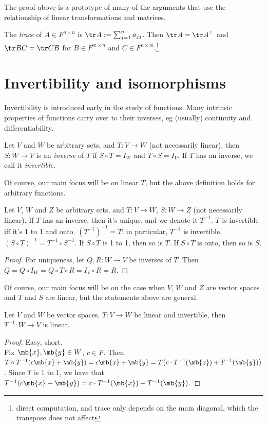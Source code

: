 The proof above is a prototype of many of the arguments that use the relationship of linear transformations and matrices.
\begin{exer}\label{e:tr-commute}
The \emph{trace} of $A \in F^{n \times n}$ is $\tr A:= \sum_{j=1}^na_{jj}$. Then $\tr A= \tr A^\top$ and $\tr BC= \tr CB$ for $B \in F^{m \times n}$ and $C \in F^{n \times m}$.\footnote{direct computation, and trace only depends on the main diagonal, which the transpose does not affect}
\end{exer}

\section{Invertibility and isomorphisms}
Invertibility is introduced early in the study of functions. Many intrinsic properties of functions carry over to their inverses, eg (usually) continuity and differentiability.
\begin{defn}
Let $V$ and $W$ be arbitrary sets, and $T:V \to W$ (not necessarily linear), then $S:W \to V$ is an \emph{inverse} of $T$ if $S \circ T=I_W$ and $T \circ S=I_V$. If $T$ has an inverse, we call it \emph{invertible}.
\end{defn}
Of course, our main focus will be on linear $T$, but the above definition holds for arbitrary functions.
\begin{lem}\label{l:comp-fn}
Let $V$, $W$ and $Z$ be arbitrary sets, and $T:V \to W$, $S:W \to Z$ (not necessarily linear). If $T$ has an inverse, then it's unique, and we denote it $T^{-1}$. $T$ is invertible iff it's 1 to 1 and onto. $(T^{-1})^{-1}=T$: in particular, $T^{-1}$ is invertible. $(S \circ T)^{-1}=T^{-1}\circ S^{-1}$. If $S \circ T$ is 1 to 1, then so is $T$. If $S \circ T$ is onto, then so is $S$.
\end{lem}
\begin{proof}
For uniqueness, let $Q,R:W \to V$ be inverses of $T$. Then $Q=Q \circ I_W=Q \circ T \circ R=I_V \circ R=R$.
\end{proof}
Of course, our main focus will be on the case when $V$, $W$ and $Z$ are vector spaces and $T$ and $S$ are linear, but the statements above are general.
\begin{lem}\label{l:inv-linear}
Let $V$ and $W$ be vector spaces, $T:V \to W$ be linear and invertible, then $T^{-1}:W \to V$ is linear.
\end{lem}
\begin{proof}
Easy, short.\\
Fix $\mb{x}, \mb{y}\in W$, $c \in F$. Then $T \circ T^{-1}(c \mb{x}+ \mb{y})=c \mb{x}+ \mb{y}=T \big( c \cdot T^{-1}( \mb{x})+T^{-1}( \mb{y}) \big)$. Since $T$ is 1 to 1, we have that $T^{-1}(c \mb{x}+ \mb{y})=c \cdot T^{-1}( \mb{x})+T^{-1}( \mb{y})$.
\end{proof}
